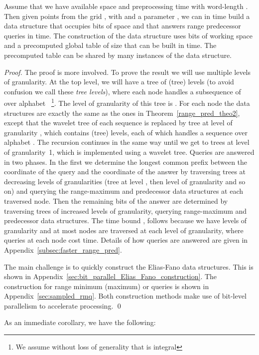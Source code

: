\documentclass[11pt,runningheads]{llncs}
\begin{document}
{\begin{theorem}
\label{range_pred_theo2}
Assume that we have available space  
and preprocessing time  with word-length 
. Then given  points from the grid , 
with  and a parameter , we can in  time build 
a data structure that occupies  bits of space and that answers range predecessor 
queries in  time. 
The construction of the data structure uses  bits of working space 
and a precomputed global table 
of size  that can be built in  time. The precomputed table can be shared 
by many instances of the data structure. 
\end{theorem}
\begin{proof}
The proof is more involved. To prove the result we will use multiple levels 
of granularity. 
At the top level, we will have a tree of  (tree) levels
(to avoid confusion we call these {\em tree levels}), where 
each node handles a subsequence of  over alphabet 
~\footnote{We assume without loss of generality that 
 is integral}. 
The level of granularity of this tree is . 
For each node the data structures are exactly the same as the ones in Theorem~\ref{range_pred_theo2}, 
except that the wavelet tree of each sequence is replaced by tree at level of granularity 
, which contains  (tree) levels, 
each of which handles a sequence over alphabet . 
The recursion continues in the same way until we get to trees at level of granularity~1, 
which is implemented using a wavelet tree. 
Queries are answered in two phases. In the first we determine the longest common 
prefix between the  coordinate of the query and the  coordinate of the answer 
by traversing trees at decreasing levels of granularities
(tree at level , then level of granularity  and so on)
and querying the range-maximum and predecessor data structures at each traversed node. 
Then the remaining bits of the answer are determined by traversing trees of increased levels 
of granularity, querying range-maximum and predecessor data structures. 
The time bound , follows because we have 
 levels of granularity and at most 
nodes are traversed at each level of granularity, where queries at each node 
cost  time.
Details of how queries are answered are given in Appendix~\ref{subsec:faster_range_pred}.

The main challenge is to quickly construct the Elias-Fano data structures. This 
is shown in Appendix~\ref{sec:bit_parallel_Elias_Fano_construction}. 
The construction for range minimum (maximum) 
or queries is shown in Appendix~\ref{sec:sampled_rmq}. 
Both construction methods make use of bit-level parallelism 
to accelerate processing. 
\qed
\end{proof}
As an immediate corollary, we have the following: 

}
\end{document}

